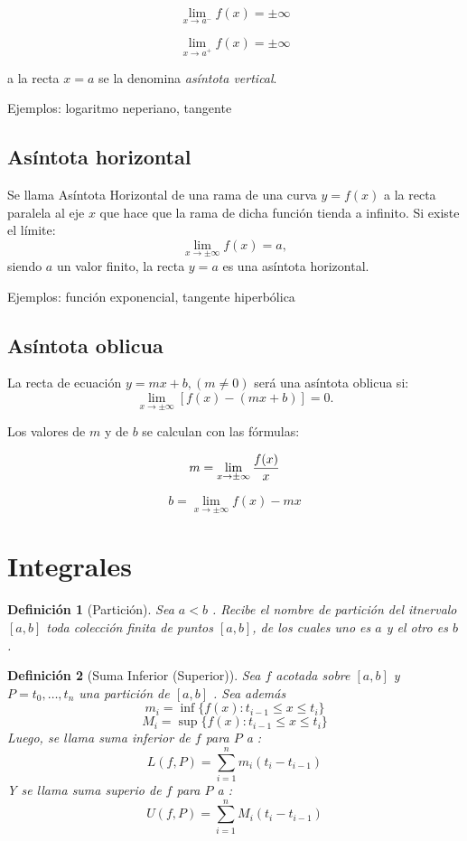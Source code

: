 \documentclass[12pt,a4paper]{extarticle}
\newtheorem{mydef}{Definici\'on}[section]
\begin{document}
\[ \lim_{x \to a^-} f(x) = \pm\infty \]


\[ \lim_{x \to a^+} f(x) = \pm\infty \]

a la recta \( x = a \)  se la denomina \emph{as\'intota vertical}.

Ejemplos: logaritmo neperiano, tangente
\subsection{As\'intota horizontal}
Se llama As\'intota Horizontal de una rama de una curva \(  y = f(x) \)  a la recta paralela al eje \( x \)  que hace que la rama de dicha funci\'on tienda a infinito. Si existe el l\'imite:
\[  \lim_{x \to \pm\infty} f(x)= a , \]
siendo \( a \)  un valor finito, la recta \( y = a \)  es una as\'intota horizontal.

Ejemplos: funci\'on exponencial, tangente hiperb\'olica
\subsection{As\'intota oblicua}
La recta de ecuaci\'on \( y = mx + b ,  (m \neq 0) \)  ser\'a una as\'intota oblicua si:
\[ \lim_{x \to \pm\infty}[f(x)-(mx+b)] = 0. \]

Los valores de \( m \)  y de \( b \)  se calculan con las f\'ormulas:

\[ m = \lim_{x \to \pm\infty}{f(x) \over x} \]

\[ b = \lim_{x \to \pm\infty}{f(x)-mx} \]

\section{Integrales}


\begin{mydef}[Partici\'on]
Sea \( a < b \) . Recibe el nombre de \emph{partici\'on} del itnervalo
\( [a,b] \) toda colecci\'on finita de puntos \( [a,b] \), de los
cuales uno es \( a \) y el otro es \( b \) .
\end{mydef}

\begin{mydef}[Suma Inferior (Superior)]
Sea \( f \) acotada sobre \( [a,b] \) y \( P = {t_0, \dots, t_n} \)
una partici\'on de \( [a,b] \) . Sea adem\'as
\[ m_i= \inf\{f(x):t_{i-1} \leq x \leq t_i\} \]
\[ M_i= \sup\{f(x):t_{i-1} \leq x \leq t_i\} \]
Luego, se llama \emph{suma inferior} de \( f \)  para \( P \) a :
\[ L(f,P)= \sum_{i=1}^n m_i(t_i-t_{i-1}) \]
Y se llama \emph{suma superio} de \( f \)  para \( P \) a :
\[ U(f,P)= \sum_{i=1}^n M_i(t_i-t_{i-1}) \]
\end{mydef}
\end{document}
